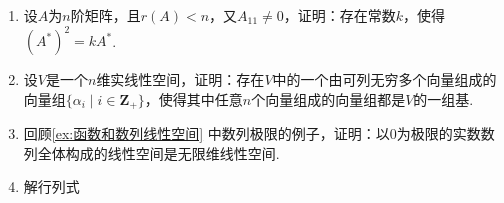 \begin{enumerate}
    \item 设$A$为$n$阶矩阵，且$r(A) < n$，又$A_{11} \neq 0$，证明：存在常数$k$，使得$(A^*)^2=kA^*$.

    \item 设$V$是一个$n$维实线性空间，证明：存在$V$中的一个由可列无穷多个向量组成的向量组$\{\alpha_i \mid i\in\mathbf{Z}_+\}$，使得其中任意$n$个向量组成的向量组都是$V$的一组基.

    \item 回顾\autoref{ex:函数和数列线性空间} 中数列极限的例子，证明：以$0$为极限的实数数列全体构成的线性空间是无限维线性空间.

    \item 解行列式
    \begin{enumerate}  
\end{enumerate}
\end{enumerate}
